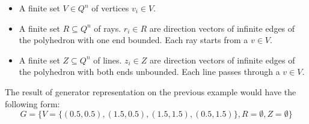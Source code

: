 \begin{itemize}
	\item A finite set $V\in Q^n$ of vertices $v_i \in V$.
	\item A finite set $R \subseteq Q^n$ of rays. $r_i \in R$ are direction vectors of infinite edges of the polyhedron with one end bounded. Each ray starts from a $v \in V$.
	\item  A finite set $Z \subseteq Q^n$ of lines. $z_i \in Z$ are direction vectors of infinite edges of the polyhedron with both ends unbounded. Each line passes through a $v \in V$.
\end{itemize}
The result of generator representation on the previous example would have the following form: 
\begin{equation}
	G = \{ V = \{(0.5,0.5),(1.5,0.5),(1.5,1.5),(0.5,1.5)\}, R = \emptyset, Z = \emptyset \}
\end{equation}
